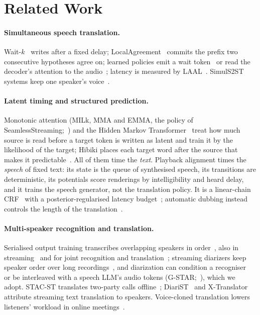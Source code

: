 \section{Related Work}
\label{sec:related}

\paragraph{Simultaneous speech translation.} Wait-$k$~\citep{ma2019stacl} writes after a fixed delay;
LocalAgreement~\citep{liu2020low,polak2022cuni,machacek2023turning} commits the prefix two consecutive hypotheses agree
on; learned policies emit a wait token~\citep{koshkin2024transllama} or read the decoder's attention to the
audio~\citep{papi2023edatt,papi2024streamatt}; latency is measured by LAAL~\citep{papi2022over}. SimulS2ST systems
keep one speaker's voice~\citep{zhang2024streamspeech,seamless2023,labiausse2025hibiki,cheng2025liveinterpret,he2026simuls2st,deng2025simuls2s}.

\paragraph{Latent timing and structured prediction.} Monotonic attention (MILk, MMA and EMMA, the policy of
SeamlessStreaming;~\citealp{arivazhagan2019milk,ma2020mma,ma2023emma}) and the Hidden Markov
Transformer~\citep{zhang2023hmt} treat how much source is read before a target token is written as latent and train it
by the likelihood of the target; Hibiki places each target word after the source that makes it
predictable~\citep{labiausse2025hibiki}. All of them time the \emph{text}. Playback alignment times the \emph{speech} of
fixed text: its state is the queue of synthesised speech, its transitions are deterministic, its potentials score
renderings by intelligibility and heard delay, and it trains the speech generator, not the translation policy. It is a
linear-chain CRF~\citep{lafferty2001crf} with a posterior-regularised latency budget~\citep{ganchev2010posterior};
automatic dubbing instead controls the length of the translation~\citep{lakew2022isometric}.

\paragraph{Multi-speaker recognition and translation.} Serialised output training transcribes overlapping speakers
in order~\citep{kanda2020sot,kanda2021saasr}, also in streaming~\citep{kanda2022tsot} and for joint recognition and
translation~\citep{papi2023tsot}; streaming diarizers keep speaker order over long
recordings~\citep{park2024sortformer,medennikov2025streaming}, and diarization can condition a
recogniser~\citep{polok2026dicow,huo2026tagspeech} or be interleaved with a speech LLM's audio tokens
(G-STAR;~\citealp{peng2026gstar}), which we adopt. STAC-ST translates two-party calls offline~\citep{zuluaga2023stac};
DiariST~\citep{yang2024diarist} and X-Translator~\citep{zhao2026xtranslator} attribute streaming text translation to
speakers. Voice-cloned translation lowers listeners' workload in online meetings~\citep{ma2026samevoice}.
